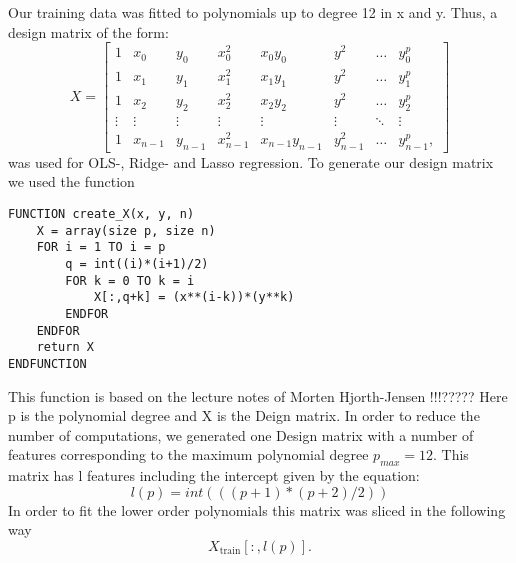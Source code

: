 Our training data was fitted to polynomials up
to degree 12 in x and y. Thus, a design matrix of the form:
\begin{equation*}
    X = 
    \begin{bmatrix}

        1 & x_{0} & y_0 & x_{0}^{2} & x_0 y_0 & y^2 & \dots &y_{0}^{p} \\
        1 & x_{1} & y_1 & x_{1}^{2} & x_1 y_1 & y^2 & \dots &y_{1}^{p} \\
        1 & x_{2} & y_2 & x_{2}^{2} & x_2 y_2 & y^2 & \dots &y_{2}^{p} \\
        \vdots &\vdots &\vdots &\vdots &\vdots & \vdots & \ddots & \vdots \\
        1&x_{n-1} & y_{n-1} & x_{n-1}^2 & x_{n-1} y_{n-1} & y_{n-1}^2 & \dots &y_{n-1}^{p}, 
    \end{bmatrix}
\end{equation*}
was used for OLS-, Ridge- and Lasso regression. To generate our design matrix we used the function
\begin{lstlisting}
FUNCTION create_X(x, y, n)
	X = array(size p, size n)
	FOR i = 1 TO i = p
		q = int((i)*(i+1)/2)
		FOR k = 0 TO k = i
			X[:,q+k] = (x**(i-k))*(y**k)
		ENDFOR
	ENDFOR
	return X
ENDFUNCTION
\end{lstlisting}
This function is based on the lecture notes of Morten Hjorth-Jensen !!!?????%
Here p is the polynomial degree and X is the Deign matrix. 
In order to reduce the number of computations, we generated one Design matrix
with a number of features corresponding to the maximum polynomial degree $p_{max}
= 12$. This matrix has l features including the intercept given by the
equation: 
\begin{equation*}
        l(p) = int(((p+1)*(p+2)/2))		
\end{equation*}
In order to fit the lower order polynomials this matrix was sliced in the
following way
\begin{equation*}
    X_{\text{train}}[:,l(p)].
\end{equation*}

  




